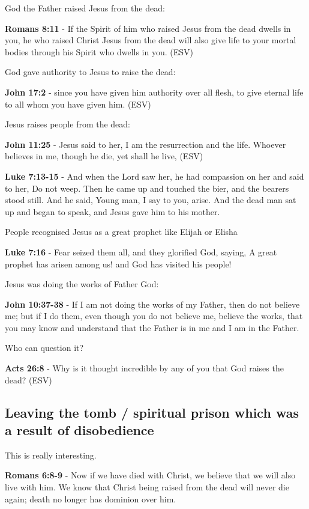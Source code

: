\documentclass[11pt]{article}
\begin{document}
God the Father raised Jesus from the dead:

\textbf{Romans 8:11} - If the Spirit of him who raised Jesus from the dead dwells in you, he who raised Christ Jesus from the dead will also give life to your mortal bodies through his Spirit who dwells in you. (ESV)

God gave authority to Jesus to raise the dead:

\textbf{John 17:2} - since you have given him authority over all flesh, to give eternal life to all whom you have given him. (ESV)

Jesus raises people from the dead:

\textbf{John 11:25} - Jesus said to her, I am the resurrection and the life. Whoever believes in me, though he die, yet shall he live, (ESV)

\textbf{Luke 7:13-15} - And when the Lord saw her, he had compassion on her and said to her, Do not weep. Then he came up and touched the bier, and the bearers stood still. And he said, Young man, I say to you, arise. And the dead man sat up and began to speak, and Jesus gave him to his mother.

People recognised Jesus as a great prophet like Elijah or Elisha

\textbf{Luke 7:16} - Fear seized them all, and they glorified God, saying, A great prophet has arisen among us! and God has visited his people!

Jesus was doing the works of Father God:

\textbf{John 10:37-38} - If I am not doing the works of my Father, then do not believe me; but if I do them, even though you do not believe me, believe the works, that you may know and understand that the Father is in me and I am in the Father.

Who can question it?

\textbf{Acts 26:8} -  Why is it thought incredible by any of you that God raises the dead?  (ESV)

\subsection{Leaving the tomb / spiritual prison which was a result of disobedience}
\label{sec:orgec90dce}
This is really interesting.

\textbf{Romans 6:8-9} - Now if we have died with Christ, we believe that we will also live with him. We know that Christ being raised from the dead will never die again; death no longer has dominion over him.
\end{document}
